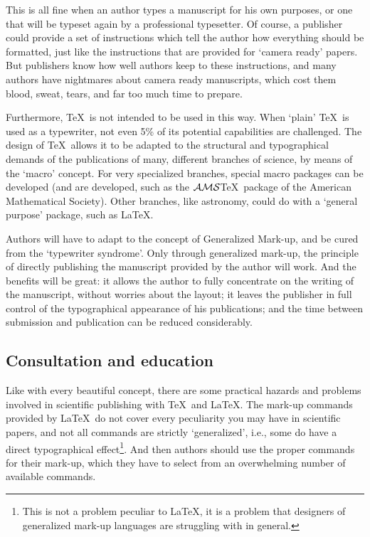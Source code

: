 This is all fine when an author types a manuscript for his own purposes,
or one that will be typeset again by a professional typesetter.
Of course, a publisher could provide a set of instructions which tell
the author how everything should be formatted, just like the instructions
that are provided for `camera ready' papers.
But publishers know how well authors keep to these instructions, and many
authors have nightmares about camera ready manuscripts, which cost them
blood, sweat, tears, and far too much time to prepare.

Furthermore, \TeX\ is not intended to be used in this way.
When `plain' \TeX\ is used as a typewriter, not even 5\% of its potential
capabilities are challenged.
The design of \TeX\ allows it to be adapted to the structural and typographical
demands of the publications of many, different branches of science, by
means of the `macro' concept.
For very specialized branches, special macro packages can be developed
(and are developed, such as the $\cal AMS$\TeX\ package of the American
Mathematical Society).
Other branches, like astronomy, could do with a `general purpose' package,
such as \LaTeX.

Authors will have to adapt to the concept of Generalized Mark-up, and
be cured from the `typewriter syndrome'.
Only through generalized mark-up, the principle of directly publishing
the manuscript provided by the author will work.
And the benefits will be great:
it allows the author to fully concentrate on the writing of the manuscript,
without worries about the layout; it leaves the publisher in full
control of the typographical appearance of his publications; and the
time between submission and publication can be reduced considerably.

\subsection{Consultation and education}

Like with every beautiful concept, there are some practical hazards and
problems involved in scientific publishing with \TeX\ and \LaTeX.
The mark-up commands provided by \LaTeX\ do not cover every peculiarity
you may have in scientific papers, and not all commands are strictly
`generalized', i.e., some do have a direct typographical effect\footnote{
 This is not a problem peculiar to \LaTeX, it is a problem that designers
 of generalized mark-up languages are struggling with in general.}.
%
And then authors should use the proper commands for their mark-up, which
they have to select from an overwhelming number of available commands.

